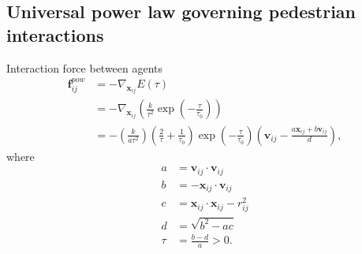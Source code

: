 \subsection{Universal power law governing pedestrian interactions}
Interaction force between agents
\begin{align}
\mathbf{f}_{ij}^{pow} &= -\nabla_{\mathbf{x}_{ij}} E(\tau)  \\
&= -\nabla_{\mathbf{x}_{ij}} \left(\frac{k}{\tau^{2}} \exp \left( -\frac{\tau}{\tau_{0}} \right) \right) \\
&= - \left(\frac{k}{a \tau^{2}}\right) 
\left(\frac{2}{\tau} + \frac{1}{\tau_{0}}\right) 
\exp\left (-\frac{\tau}{\tau_{0}}\right )
\left(\mathbf{v}_{ij} -\frac{a \mathbf{x}_{ij} + b \mathbf{v}_{ij}}{d} \right),
\end{align}
where
\begin{align}
a &= \mathbf{v}_{ij} \cdot \mathbf{v}_{ij} \\
b &= -\mathbf{x}_{ij} \cdot \mathbf{v}_{ij} \\
c &= \mathbf{x}_{ij} \cdot \mathbf{x}_{ij} - r_{ij}^{2} \\
d &= \sqrt{b^{2} - a c} \\
\tau &= \frac{b - d}{a} > 0.
\end{align}
